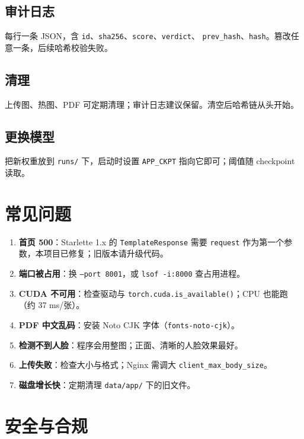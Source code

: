 \documentclass[12pt,a4paper]{article}
\begin{document}
\subsection{审计日志}

每行一条 JSON，含 \texttt{id}、\texttt{sha256}、\texttt{score}、\texttt{verdict}、
\texttt{prev\_hash}、\texttt{hash}。篡改任意一条，后续哈希校验失败。

\subsection{清理}

上传图、热图、PDF 可定期清理；审计日志建议保留。清空后哈希链从头开始。

\subsection{更换模型}

把新权重放到 \texttt{runs/} 下，启动时设置 \texttt{APP\_CKPT} 指向它即可；阈值随 checkpoint 读取。

\section{常见问题}

\begin{enumerate}
  \item \textbf{首页 500}：Starlette 1.x 的 \texttt{TemplateResponse} 需要 \texttt{request} 作为第一个参数，本项目已修复；旧版本请升级代码。
  \item \textbf{端口被占用}：换 \texttt{--port 8001}，或 \texttt{lsof -i:8000} 查占用进程。
  \item \textbf{CUDA 不可用}：检查驱动与 \texttt{torch.cuda.is\_available()}；CPU 也能跑（约 37 ms/张）。
  \item \textbf{PDF 中文乱码}：安装 Noto CJK 字体（\texttt{fonts-noto-cjk}）。
  \item \textbf{检测不到人脸}：程序会用整图；正面、清晰的人脸效果最好。
  \item \textbf{上传失败}：检查大小与格式；Nginx 需调大 \texttt{client\_max\_body\_size}。
  \item \textbf{磁盘增长快}：定期清理 \texttt{data/app/} 下的旧文件。
\end{enumerate}

\section{安全与合规}
\end{document}
